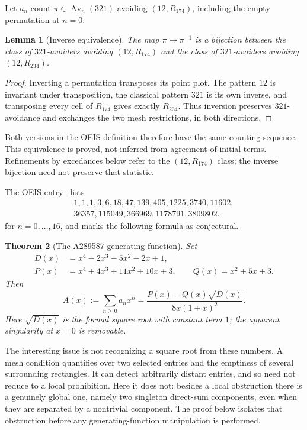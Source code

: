 \documentclass[11pt,letterpaper]{article}
\numberwithin{equation}{section}
\newtheorem{theorem}{Theorem}[section]
\newtheorem{lemma}[theorem]{Lemma}
\theoremstyle{definition}
\DeclareMathOperator{\Av}{Av}
\newcommand{\Rone}{R_{174}}
\newcommand{\Rtwo}{R_{234}}
\begin{document}
Let $a_n$ count $\pi\in\Av_n(321)$ avoiding $(12,\Rone)$, including the
empty permutation at $n=0$.

\begin{lemma}[Inverse equivalence]
\label{lem:inverse}
The map $\pi\mapsto\pi^{-1}$ is a bijection between the class of
$321$-avoiders avoiding $(12,\Rone)$ and the class of $321$-avoiders
avoiding $(12,\Rtwo)$.
\end{lemma}
\begin{proof}
Inverting a permutation transposes its point plot. The pattern $12$ is
invariant under transposition, the classical pattern $321$ is its own
inverse, and transposing every cell of $\Rone$ gives exactly $\Rtwo$.
Thus inversion preserves $321$-avoidance and exchanges the two mesh
restrictions, in both directions.
\end{proof}

\noindent
Both versions in the OEIS definition therefore have the same counting
sequence. This equivalence is proved, not inferred from agreement of
initial terms. Refinements by excedances below refer to the $(12,\Rone)$
class; the inverse bijection need not preserve that statistic.

The OEIS entry~\cite{oeis} lists
\[
\begin{gathered}
1,1,1,3,6,18,47,139,405,1225,3740,11602,\\
36357,115049,366969,1178791,3809802.
\end{gathered}
\]
for $n=0,\ldots,16$, and marks the following formula as conjectural.

\begin{theorem}[The A289587 generating function]
\label{thm:main}
Set
\begin{align*}
 D(x)&=x^4-2x^3-5x^2-2x+1,\\
 P(x)&=x^4+4x^3+11x^2+10x+3,\qquad Q(x)=x^2+5x+3.
\end{align*}
Then
\begin{equation}
 \boxed{\displaystyle
 A(x):=\sum_{n\ge0}a_nx^n
   =\frac{P(x)-Q(x)\sqrt{D(x)}}{8x(1+x)^2}.}
 \label{eq:main}
\end{equation}
Here $\sqrt{D(x)}$ is the formal square root with constant term $1$;
the apparent singularity at $x=0$ is removable.
\end{theorem}

The interesting issue is not recognizing a square root from these numbers.
A mesh condition quantifies over two selected entries and the emptiness of
several surrounding rectangles. It can detect arbitrarily distant entries,
and so need not reduce to a local prohibition. Here it does not: besides a
local obstruction there is a genuinely global one, namely two singleton
direct-sum components, even when they are separated by a nontrivial
component. The proof below isolates that obstruction before any
generating-function manipulation is performed.
\end{document}

